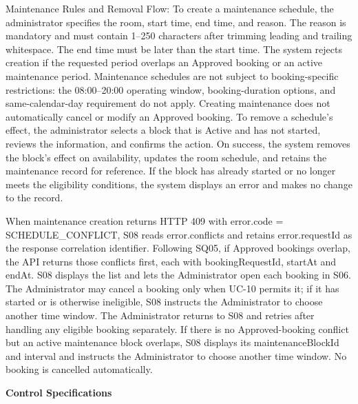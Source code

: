 Maintenance Rules and Removal Flow: To create a maintenance schedule,
the administrator specifies the room, start time, end time, and reason.
The reason is mandatory and must contain 1--250 characters after
trimming leading and trailing whitespace. The end time must be later
than the start time. The system rejects creation if the requested period
overlaps an Approved booking or an active maintenance period.
Maintenance schedules are not subject to booking-specific restrictions:
the 08:00--20:00 operating window, booking-duration options, and
same-calendar-day requirement do not apply. Creating maintenance does
not automatically cancel or modify an Approved booking. To remove a
schedule's effect, the administrator selects a block
that is Active and has not started, reviews the information, and
confirms the action. On success, the system removes the
block's effect on availability, updates the room
schedule, and retains the maintenance record for reference. If the block
has already started or no longer meets the eligibility conditions, the
system displays an error and makes no change to the record.

When maintenance creation returns HTTP 409 with
error.code = SCHEDULE\_CONFLICT, S08 reads error.conflicts and retains
error.requestId as the response correlation identifier. Following SQ05,
if Approved bookings overlap, the API returns those conflicts first, each
with bookingRequestId, startAt and endAt. S08 displays the list and lets
the Administrator open each booking in S06. The Administrator may cancel
a booking only when UC-10 permits it; if it has started or is otherwise
ineligible, S08 instructs the Administrator to choose another time
window. The Administrator returns to S08 and retries after handling any
eligible booking separately. If there is no Approved-booking conflict
but an active maintenance block overlaps, S08 displays its
maintenanceBlockId and interval and instructs the Administrator to
choose another time window. No booking is cancelled automatically.

\textbf{Control Specifications}

